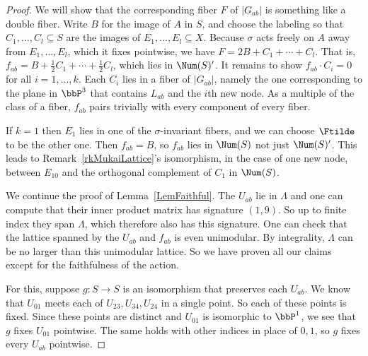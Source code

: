 \begin{proof}
We will show that the corresponding fiber $F$ of $|G_{ab}|$ is something like a double fiber. Write $B$ for the image of $A$ in $S$, and choose the labeling so that $C_1,\dots,C_l\subseteq S$ are the images of $E_1,\dots,E_l\subseteq X$. Because $\sigma$ acts freely on $A$ away from $E_1,\dots,E_l$, which it fixes pointwise, we have $F=2B+C_1+\cdots+C_l$. That is, $f_{ab}=B+\frac12C_1+\cdots+\frac12C_l$, which lies in $\Num(S)'$. It remains to show $f_{ab}\cdot C_i=0$ for all $i=1,\dots,k$. Each $C_i$ lies in a fiber of $|G_{ab}|$, namely the one corresponding to the plane in $\bbP^3$ that contains $L_{ab}$ and the $i$th new node. As a multiple of the class of a fiber, $f_{ab}$ pairs trivially with every component of every fiber.%
\begin{rema*}
If $k=1$ then $E_1$ lies in one of the $\sigma$-invariant fibers, and we can choose $\Ftilde$ to be the other one. Then $f_{ab}=B$, so $f_{ab}$ lies in $\Num(S)$ not just $\Num(S)'$. This leads to Remark~\ref{rkMukaiLattice}'s isomorphism, in the case of one new node, between $E_{10}$ and the orthogonal complement of $C_1$ in $\Num(S)$.
\end{rema*}

We continue the proof of Lemma~\ref{LemFaithful}. The $U_{ab}$ lie in $\Lambda$ and one can compute that their inner product matrix has signature $(1,9)$. So up to finite index they span $\Lambda$, which therefore also has this signature. One can check that the lattice spanned by the $U_{ab}$ and $f_{ab}$ is even unimodular. By integrality, $\Lambda$ can be no larger than this unimodular lattice. So we have proven all our claims except for the faithfulness of the action.

For this, suppose $g:S\to S$ is an isomorphism that preserves each $U_{ab}$. We know that $U_{01}$ meets each of $U_{23},U_{34},U_{24}$ in a single point. So each of these points is fixed. Since these points are distinct and $U_{01}$ is isomorphic to $\bbP^1$, we see that $g$ fixes $U_{01}$ pointwise. The same holds with other indices in place of $0,1$, so $g$ fixes every $U_{ab}$ pointwise.


\end{proof}
